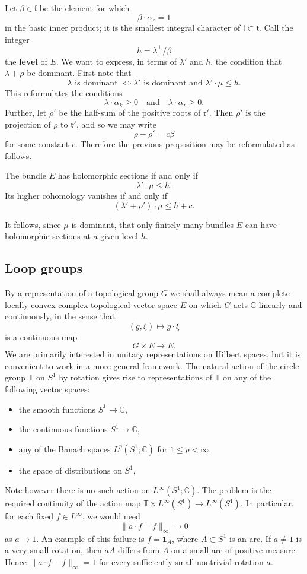 \documentclass[12pt]{article}
\begin{document}
Let \(\beta\in \mathfrak l\) be the element for which
\[
\beta\cdot \alpha_r = 1
\]
in the basic inner product; it is the smallest integral character of \(\mathfrak l\subset \mathfrak t\). Call the integer
\[
h = \lambda^{\perp}/\beta
\]
the \textbf{level} of \(E\). We want to express, in terms of \(\lambda'\) and \(h\), the condition that \(\lambda+\rho\) be dominant. First note that
\[
\lambda \text{ is dominant }
\Longleftrightarrow
\lambda' \text{ is dominant and } \lambda'\cdot \mu \le h.
\]
This reformulates the conditions
\[
\lambda\cdot \alpha_k \ge 0
\quad\text{and}\quad
\lambda\cdot \alpha_r \ge 0.
\]
Further, let \(\rho'\) be the half-sum of the positive roots of \(\mathfrak r'\). Then \(\rho'\) is the projection of \(\rho\) to \(\mathfrak r'\), and so we may write
\[
\rho-\rho' = c\beta
\]
for some constant \(c\). Therefore the previous proposition may be reformulated as follows.

\begin{proposition}
The bundle \(E\) has holomorphic sections if and only if
\[
\lambda'\cdot \mu \le h.
\]
Its higher cohomology vanishes if and only if
\[
(\lambda'+\rho')\cdot \mu \le h+c.
\]
\end{proposition}

It follows, since \(\mu\) is dominant, that only finitely many bundles \(E\) can have holomorphic sections at a given level \(h\).

\subsection{Loop groups}
By a representation of a topological group \(G\) we shall always mean a complete locally convex complex topological vector space \(E\) on which \(G\) acts \(\mathbb C\)-linearly and continuously, in the sense that
\[
(g,\xi)\longmapsto g\cdot \xi
\]
is a continuous map
\[
G\times E \to E.
\]
We are primarily interested in unitary representations on Hilbert spaces, but it is convenient to work in a more general framework. The natural action of the circle group \(\mathbb T\) on \(S^1\) by rotation gives rise to representations of \(\mathbb T\) on any of the following vector spaces:
\begin{itemize}
    \item the smooth functions \(S^1\to \mathbb C\),
    \item the continuous functions \(S^1\to \mathbb C\),
    \item any of the Banach spaces \(L^p(S^1;\mathbb C)\) for \(1\le p<\infty\),
    \item the space of distributions on \(S^1\),
\end{itemize}
Note however there is no such action on \(L^\infty(S^1;\mathbb C)\). The problem is the required continuity of the action map $\mathbb T\times L^\infty(S^1)\to L^\infty(S^1)$. In particular, for each fixed $f\in L^\infty$, we would need
\[\|a\cdot f-f\|_\infty\to 0\]
as $a\to 1$. An example of this failure is $f=\mathbf 1_{A}$, where $A\subset S^1$ is an arc. If $a\neq 1$ is a very small rotation, then $aA$ differs from $A$ on a small arc of positive measure. Hence $\|a\cdot f-f\|_\infty=1$ for every sufficiently small nontrivial rotation $a$. 
\end{document}
